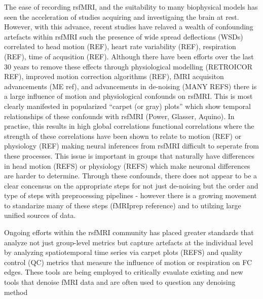 \documentclass[oneside]{zHenriquesLab-StyleBioRxiv}
\begin{document}

The ease of recording rsfMRI, and the suitability to many biophysical models has seen the acceleration of studies acquiring and investigaing the brain at rest. However, with this advance, recent studies have relaved a wealth of confounding artefacts within rsfMRI such the presence of wide spread deflections (WSDs) correlated to head motion (REF), heart rate variability (REF), respiration (REF), time of acqusition (REF). Although there have been efforts over the last 30 years to remove these effects through physiological modelling (RETROICOR REF), improved motion correction algorithms (REF), fMRI acquisiton advancements (ME ref), and advancements in de-noising (MANY REFS) there is a large influence of motion and physiological confounds on rsfMRI. This is most clearly manifested in popularized ``carpet (or gray) plots'' which show temporal relationships of these confounds with rsfMRI (Power, Glasser, Aquino). In practise, this results in high global correlations functional correlations where the strength of these correlations have been shown to relate to motion (REF) or physiology (REF) making neural inferences from rsfMRI difficult to seperate from these processes. This issue is important in groups that naturally have differences in head motion (REFS) or physiology (REFS) which make neuronal differences are harder to determine. Through these confounds, there does not appear to be a clear concensus on the appropriate steps for not just de-noising but the order and type of steps with preprocessing pipelines - however there is a growing movement to standarize many of these steps (fMRIprep reference) and to utilzing large unified sources of data.


Ongoing efforts within the rsfMRI community has placed greater standards that analyze not just group-level metrics but capture artefacts at the individual level by analyzing spatiotemporal time series via carpet plots (REFS) and quality control (QC) metrics that measure the influence of motion or respiration on FC edges. These tools are being employed to critically evaulate existing and new tools that denoise fMRI data and are often used to question any denoising method \cite{ciric2017benchmarking,Parkes:2018dz} 
\end{document}
